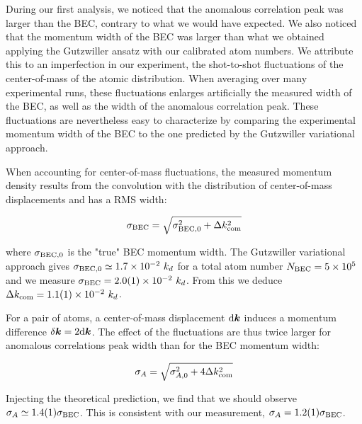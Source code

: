 During our first analysis, we noticed that the anomalous correlation peak was larger than the BEC, contrary to what we would have expected. We also noticed that the momentum width of the BEC was larger than what we obtained applying the Gutzwiller ansatz with our calibrated atom numbers. We attribute this to an imperfection in our experiment, the shot-to-shot fluctuations of the center-of-mass of the atomic distribution. When averaging over many experimental runs, these fluctuations enlarges artificially the measured width of the BEC, as well as the width of the anomalous correlation peak. These fluctuations are nevertheless easy to characterize by comparing the experimental momentum width of the BEC to the one predicted by the Gutzwiller variational approach.

When accounting for center-of-mass fluctuations, the measured momentum density results from the convolution with the distribution of center-of-mass displacements and has a RMS width:

\begin{equation}
    \sigma_{\rm{BEC}}=\sqrt{\sigma_{\rm{BEC},0}^2+\Delta k_{\rm{com}}^2}
\end{equation}

where $\sigma_{\rm{BEC},0}$ is the "true" BEC momentum width. The Gutzwiller variational approach gives  $\sigma_{\rm{BEC},0} \simeq 1.7 \times 10^{-2} \ k_d$ for a total atom number $N_{\rm{BEC}} = 5 \times 10^5$ and we measure $\sigma_{\rm{BEC}}=2.0(1) \times 10^{-2} \ k_d$. From this we deduce $\Delta k_{\rm{com}}=1.1(1) \times 10^{-2} \ k_d$.

For a \kmk pair of atoms, a center-of-mass displacement ${\rm{d}} \bm{k}$ induces a momentum difference $\delta \bm{k}=2 {\rm{d}} \bm{k}$. The effect of the fluctuations are thus twice larger for anomalous correlations peak width than for the BEC momentum width:

\begin{equation}
    \sigma_A = \sqrt{\sigma_{A,0}^2+4\Delta k_{\rm{com}}^2}
\end{equation}

Injecting the theoretical prediction, we find that we should observe $\sigma_A \simeq 1.4(1) \sigma_{\rm BEC}$. This is consistent with our measurement, $\sigma_A = 1.2(1) \sigma_{\rm BEC}$.




